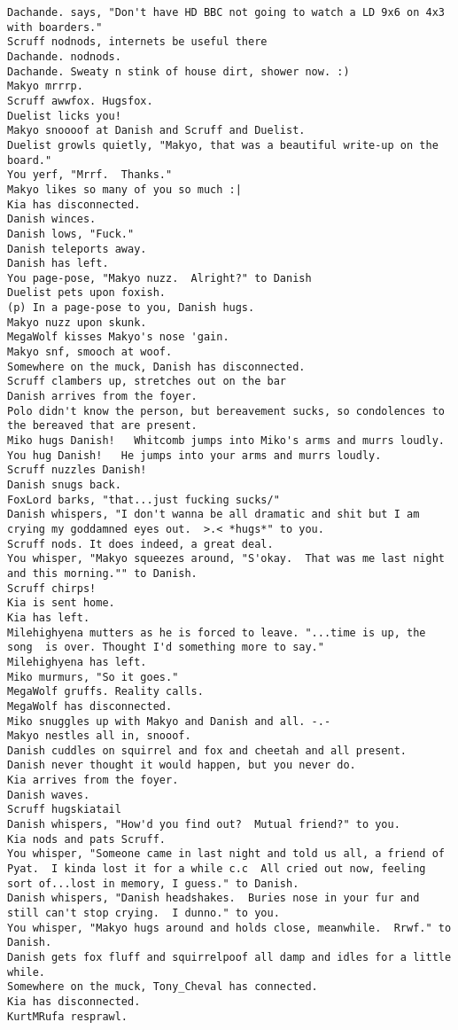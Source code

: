 \begin{verbatim}
Dachande. says, "Don't have HD BBC not going to watch a LD 9x6 on 4x3 with boarders."
Scruff nodnods, internets be useful there
Dachande. nodnods.
Dachande. Sweaty n stink of house dirt, shower now. :)
Makyo mrrrp.
Scruff awwfox. Hugsfox.
Duelist licks you!
Makyo snoooof at Danish and Scruff and Duelist.
Duelist growls quietly, "Makyo, that was a beautiful write-up on the board."
You yerf, "Mrrf.  Thanks."
Makyo likes so many of you so much :|
Kia has disconnected.
Danish winces.
Danish lows, "Fuck."
Danish teleports away.
Danish has left.
You page-pose, "Makyo nuzz.  Alright?" to Danish
Duelist pets upon foxish.
(p) In a page-pose to you, Danish hugs.
Makyo nuzz upon skunk.
MegaWolf kisses Makyo's nose 'gain.
Makyo snf, smooch at woof.
Somewhere on the muck, Danish has disconnected.
Scruff clambers up, stretches out on the bar
Danish arrives from the foyer.
Polo didn't know the person, but bereavement sucks, so condolences to the bereaved that are present.
Miko hugs Danish!   Whitcomb jumps into Miko's arms and murrs loudly.
You hug Danish!   He jumps into your arms and murrs loudly.
Scruff nuzzles Danish!
Danish snugs back.
FoxLord barks, "that...just fucking sucks/"
Danish whispers, "I don't wanna be all dramatic and shit but I am crying my goddamned eyes out.  >.< *hugs*" to you.
Scruff nods. It does indeed, a great deal.
You whisper, "Makyo squeezes around, "S'okay.  That was me last night and this morning."" to Danish.
Scruff chirps!
Kia is sent home.
Kia has left.
Milehighyena mutters as he is forced to leave. "...time is up, the song  is over. Thought I'd something more to say."
Milehighyena has left.
Miko murmurs, "So it goes."
MegaWolf gruffs. Reality calls.
MegaWolf has disconnected.
Miko snuggles up with Makyo and Danish and all. -.-
Makyo nestles all in, snooof.
Danish cuddles on squirrel and fox and cheetah and all present.
Danish never thought it would happen, but you never do.
Kia arrives from the foyer.
Danish waves.
Scruff hugskiatail
Danish whispers, "How'd you find out?  Mutual friend?" to you.
Kia nods and pats Scruff.
You whisper, "Someone came in last night and told us all, a friend of Pyat.  I kinda lost it for a while c.c  All cried out now, feeling sort of...lost in memory, I guess." to Danish.
Danish whispers, "Danish headshakes.  Buries nose in your fur and still can't stop crying.  I dunno." to you.
You whisper, "Makyo hugs around and holds close, meanwhile.  Rrwf." to Danish.
Danish gets fox fluff and squirrelpoof all damp and idles for a little while.
Somewhere on the muck, Tony_Cheval has connected.
Kia has disconnected.
KurtMRufa resprawl.

\end{verbatim}
